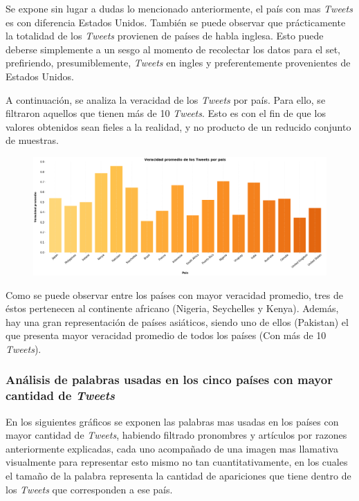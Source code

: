 \documentclass[titlepage,a4paper]{article}
\begin{document}
    Se expone sin lugar a dudas lo mencionado anteriormente, el país con mas \textit{Tweets} es con diferencia Estados Unidos. También se puede observar que prácticamente la totalidad de los \textit{Tweets} provienen de países de habla inglesa. Esto puede deberse simplemente a  un sesgo al momento de recolectar los datos para el set, prefiriendo, presumiblemente, \textit{Tweets} en ingles y preferentemente provenientes de Estados Unidos.
    
    A continuación, se analiza la veracidad de los \textit{Tweets} por país. Para ello, se filtraron aquellos que tienen más de 10 \textit{Tweets}. Esto es con el fin de que los valores obtenidos sean fieles a la realidad, y no producto de un reducido conjunto de muestras.

    \begin{figure}[H]
    \centering
    \includegraphics[width=1\textwidth]{graficos/Analisis de Locacion/veracidad_promedio_de_los_tweets_por_pais.png}
    \caption{}
    \end{figure}
    
    Como se puede observar entre los países con mayor veracidad promedio, tres de éstos pertenecen al continente africano (Nigeria, Seychelles y Kenya). Además, hay una gran representación de países asiáticos, siendo uno de ellos (Pakistan) el que presenta mayor veracidad promedio de todos los países (Con más de 10 \textit{Tweets}). 
    
    \subsubsection{Análisis de palabras usadas en los cinco países con mayor cantidad de \textit{Tweets}}
    En los siguientes gráficos se exponen las palabras mas usadas en los países con mayor cantidad de \textit{Tweets}, habiendo filtrado pronombres y artículos por razones anteriormente explicadas, cada uno acompañado de una imagen mas llamativa visualmente para representar esto mismo no tan cuantitativamente, en los cuales el tamaño de la palabra representa la cantidad de apariciones que tiene dentro de los \textit{Tweets} que corresponden a ese país.
    
\end{document}
